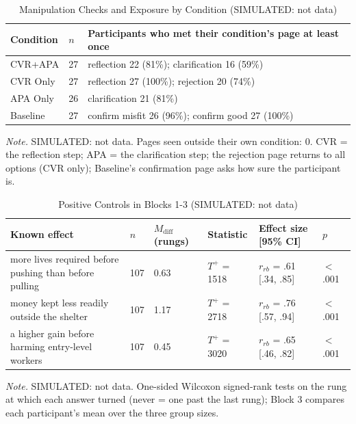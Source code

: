 \begin{table}[htbp]
\centering
\begin{threeparttable}
\caption{Manipulation Checks and Exposure by Condition (SIMULATED: not data)}
\label{tab:fidelity}
\footnotesize
\begin{tabular}{lll}
\toprule
Condition & $n$ & Participants who met their condition's page at least once \\
\midrule
CVR+APA & 27 & reflection 22 (81\%); clarification 16 (59\%) \\
CVR Only & 27 & reflection 27 (100\%); rejection 20 (74\%) \\
APA Only & 26 & clarification 21 (81\%) \\
Baseline & 27 & confirm misfit 26 (96\%); confirm good 27 (100\%) \\
\bottomrule
\end{tabular}
\begin{tablenotes}[flushleft]
\footnotesize
\item \textit{Note.} SIMULATED: not data. Pages seen outside their own condition: 0. CVR = the reflection step; APA = the clarification step; the rejection page returns to all options (CVR only); Baseline's confirmation page asks how sure the participant is.
\end{tablenotes}
\end{threeparttable}
\end{table}
\begin{table}[htbp]
\centering
\begin{threeparttable}
\caption{Positive Controls in Blocks 1-3 (SIMULATED: not data)}
\label{tab:controls}
\footnotesize
\begin{tabular}{llllll}
\toprule
Known effect & $n$ & $M_{\text{diff}}$ (rungs) & Statistic & Effect size [95\% CI] & $p$ \\
\midrule
more lives required before pushing than before pulling & 107 & 0.63 & $T^{+}$ = 1518 & $r_{rb}$ = .61 [.34, .85] & $<$ .001 \\
money kept less readily outside the shelter & 107 & 1.17 & $T^{+}$ = 2718 & $r_{rb}$ = .76 [.57, .94] & $<$ .001 \\
a higher gain before harming entry-level workers & 107 & 0.45 & $T^{+}$ = 3020 & $r_{rb}$ = .65 [.46, .82] & $<$ .001 \\
\bottomrule
\end{tabular}
\begin{tablenotes}[flushleft]
\footnotesize
\item \textit{Note.} SIMULATED: not data. One-sided Wilcoxon signed-rank tests on the rung at which each answer turned (never = one past the last rung); Block 3 compares each participant's mean over the three group sizes.
\end{tablenotes}
\end{threeparttable}
\end{table}

